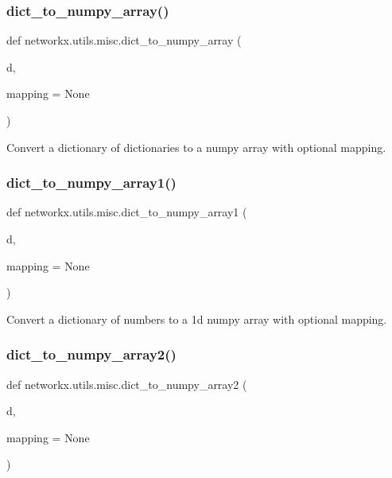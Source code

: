\subsubsection{\texorpdfstring{dict\+\_\+to\+\_\+numpy\+\_\+array()}{dict\_to\_numpy\_array()}}
{\footnotesize\ttfamily def networkx.\+utils.\+misc.\+dict\+\_\+to\+\_\+numpy\+\_\+array (\begin{DoxyParamCaption}\item[{}]{d,  }\item[{}]{mapping = {\ttfamily None} }\end{DoxyParamCaption})}

\begin{DoxyVerb}Convert a dictionary of dictionaries to a numpy array
with optional mapping.\end{DoxyVerb}
 \mbox{\label{namespacenetworkx_1_1utils_1_1misc_a60cdb087fa42789016076eff206215c2}} 
\subsubsection{\texorpdfstring{dict\+\_\+to\+\_\+numpy\+\_\+array1()}{dict\_to\_numpy\_array1()}}
{\footnotesize\ttfamily def networkx.\+utils.\+misc.\+dict\+\_\+to\+\_\+numpy\+\_\+array1 (\begin{DoxyParamCaption}\item[{}]{d,  }\item[{}]{mapping = {\ttfamily None} }\end{DoxyParamCaption})}

\begin{DoxyVerb}Convert a dictionary of numbers to a 1d numpy array
with optional mapping.\end{DoxyVerb}
 \mbox{\label{namespacenetworkx_1_1utils_1_1misc_ac681cf0a0a690ee93b36e90214e2e082}} 
\subsubsection{\texorpdfstring{dict\+\_\+to\+\_\+numpy\+\_\+array2()}{dict\_to\_numpy\_array2()}}
{\footnotesize\ttfamily def networkx.\+utils.\+misc.\+dict\+\_\+to\+\_\+numpy\+\_\+array2 (\begin{DoxyParamCaption}\item[{}]{d,  }\item[{}]{mapping = {\ttfamily None} }\end{DoxyParamCaption})}

